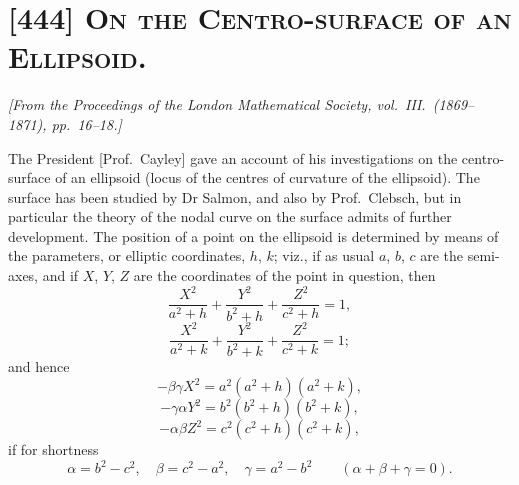 \documentclass[11pt,a4paper]{article}
\begin{document}
\bigskip

\section{[444] \textsc{On the Centro-surface of an Ellipsoid.}}

\begin{center}
\textit{[From the Proceedings of the London Mathematical Society, vol.\ III.\ (1869--1871), pp.\ 16--18.]}
\end{center}

\medskip

The President [Prof.\ Cayley] gave an account of his investigations on the centro-surface of
an ellipsoid (locus of the centres of curvature of the ellipsoid). The surface has been
studied by Dr Salmon, and also by Prof.\ Clebsch, but in particular the theory of the
nodal curve on the surface admits of further development. The position of a point on the
ellipsoid is determined by means of the parameters, or elliptic coordinates, $h$, $k$;
viz., if as usual $a$, $b$, $c$ are the semi-axes, and if $X$, $Y$, $Z$ are the coordinates
of the point in question, then
\[
\frac{X^2}{a^2 + h} + \frac{Y^2}{b^2 + h} + \frac{Z^2}{c^2 + h} = 1,
\]
\[
\frac{X^2}{a^2 + k} + \frac{Y^2}{b^2 + k} + \frac{Z^2}{c^2 + k} = 1;
\]
and hence
\[
-\beta\gamma X^2 = a^2 (a^2 + h)(a^2 + k),
\]
\[
-\gamma\alpha Y^2 = b^2 (b^2 + h)(b^2 + k),
\]
\[
-\alpha\beta Z^2 = c^2 (c^2 + h)(c^2 + k),
\]
if for shortness
\[
\alpha = b^2 - c^2,\quad \beta = c^2 - a^2,\quad \gamma = a^2 - b^2 \qquad (\alpha + \beta + \gamma = 0).
\]
\end{document}
